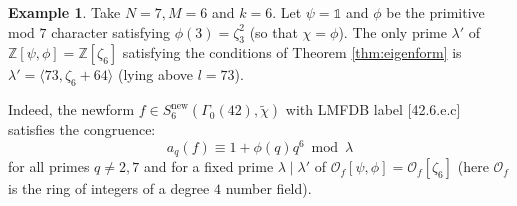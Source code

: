 \documentclass{amsart}
\theoremstyle{plain}
\theoremstyle{definition}
\newtheorem{eg}[theorem]{Example}
\begin{document}
\begin{eg}
Take $N=7, M=6$ and $k=6$. Let $\psi = \mathds{1}$ and $\phi$ be the primitive mod $7$ character satisfying $\phi(3) = \zeta_3^2$ (so that $\chi = \phi$). The only prime $\lambda'$ of $\mathbb{Z}[\psi,\phi] = \mathbb{Z}[\zeta_6]$ satisfying the conditions of Theorem \ref{thm:eigenform} is $\lambda' = \langle 73, \zeta_6+64\rangle$ (lying above $l = 73$). 

\noindent Indeed, the newform $f\in S_6^{\text{new}}(\Gamma_0(42),\tilde{\chi})$ with LMFDB label [42.6.e.c] satisfies the congruence: \[a_q(f) \equiv 1 + \phi(q)q^6\bmod \lambda\] for all primes $q\neq 2,7$ and for a fixed prime $\lambda\mid \lambda'$ of $\mathcal{O}_{f}[\psi,\phi] = \mathcal{O}_{f}[\zeta_6]$ (here $\mathcal{O}_f$ is the ring of integers of a degree $4$ number field).
\end{eg}



\end{document}
